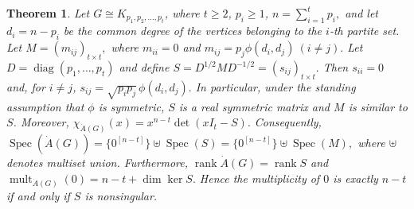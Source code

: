 \documentclass[10pt,a4paper]{amsart}
\newtheorem{theorem}{Theorem}
\newcommand{\spec}{\operatorname{Spec}}
\begin{document}
\begin{theorem}\label{thm:spectrum_complete_multipartite_updated}
	Let $G\cong K_{p_1,p_2,\ldots,p_t}$, where $t\geq 2$, $p_i\geq 1$,
	$
	n=\sum_{i=1}^t p_i,
	$
	and let
	$
	d_i=n-p_i
	$
	be the common degree of the vertices belonging to the $i$-th partite set. Let
	$
	M=(m_{ij})_{t\times t},
	$
	where
	$
	m_{ii}=0
	$
	and
	$
	m_{ij}=p_j\phi(d_i,d_j)~
	 (i\neq j).	$
	Let
	$
	D=\operatorname{diag}(p_1,\ldots,p_t)
	$
	and define
	$
	S=D^{1/2}MD^{-1/2}=(s_{ij})_{t\times t}.
	$
	Then
	$
	s_{ii}=0
	$
	and, for $i\neq j$,
	$
	s_{ij}=\sqrt{p_ip_j}\,\phi(d_i,d_j).
	$
	In particular, under the standing assumption that $\phi$ is symmetric, $S$ is a real symmetric matrix and $M$ is similar to $S$. Moreover,
	$
	\chi_{\dot A(G)}(x)
	=
	x^{n-t}\det(xI_t-S).
	$
	Consequently,
	$
	\spec(\dot A(G))
	=
	\{0^{[n-t]}\}\uplus\spec(S)
	=
	\{0^{[n-t]}\}\uplus\spec(M),
	$
	where $\uplus$ denotes multiset union. Furthermore,
	$
	\operatorname{rank}\dot A(G)
	=
	\operatorname{rank}S
	$
	and
	$
	\operatorname{mult}_{\dot A(G)}(0)
	=
	n-t+\dim\ker S.
	$
	Hence the multiplicity of $0$ is exactly $n-t$ if and only if $S$ is nonsingular.
\end{theorem}
\end{document}
